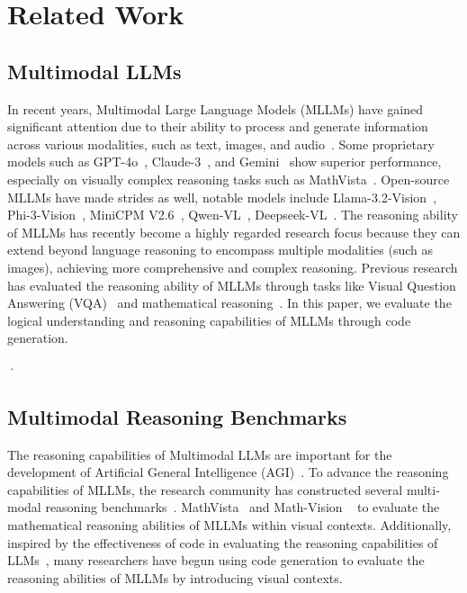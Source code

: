 \section{Related Work}
\subsection{Multimodal LLMs} 
In recent years, Multimodal Large Language Models (MLLMs) have gained significant attention due to their ability to process and generate information across various modalities, such as text, images, and audio~\cite{li2024llava,liu2024visual,zhu2023minigpt,li2024llavaonevisioneasyvisualtask,dai2023instructblipgeneralpurposevisionlanguagemodels,ye2024mplugowlmodularizationempowerslarge}. Some proprietary models such as GPT-4o~\cite{gpt4o}, Claude-3~\cite{Claude3}, and Gemini~\cite{geminiteam2024gemini15unlockingmultimodal} show superior performance, especially on visually complex reasoning tasks such as MathVista~\cite{lu2024mathvista}. Open-source MLLMs have made strides as well, notable models include Llama-3.2-Vision~\cite{Llama3.2}, Phi-3-Vision~\cite{abdin2024phi}, MiniCPM V2.6~\cite{yao2024minicpm}, Qwen-VL~\cite{bai2023qwenvlversatilevisionlanguagemodel}, Deepseek-VL~\cite{lu2024deepseek}. The reasoning ability of MLLMs has recently become a highly regarded research focus because they can extend beyond language reasoning to encompass multiple modalities (such as images), achieving more comprehensive and complex reasoning. Previous research has evaluated the reasoning ability of MLLMs through tasks like Visual Question Answering (VQA)~\cite{mobasher2022parsvqa,gurari2018vizwiz} and mathematical reasoning~\cite{lu2024mathvista}. In this paper, we evaluate the logical understanding and reasoning capabilities of MLLMs through code generation.

·\subsection{Multimodal Reasoning Benchmarks}
The reasoning capabilities of Multimodal LLMs are important for the development of Artificial General Intelligence (AGI)~\cite{morris2023levels}. To advance the reasoning capabilities of MLLMs, the research community has constructed several multi-modal reasoning benchmarks~\cite{li2024survey}. MathVista~\cite{lu2024mathvista} and Math-Vision
~\cite{wang2024measuring} to evaluate the mathematical reasoning abilities of MLLMs within visual contexts. Additionally, inspired by the effectiveness of code in evaluating the reasoning capabilities of LLMs~\cite{chen2021evaluatinglargelanguagemodels,hendrycksapps2021,jain2024livecodebench,austin2021program}, many researchers have begun using code generation to evaluate the reasoning abilities of MLLMs by introducing visual contexts.

